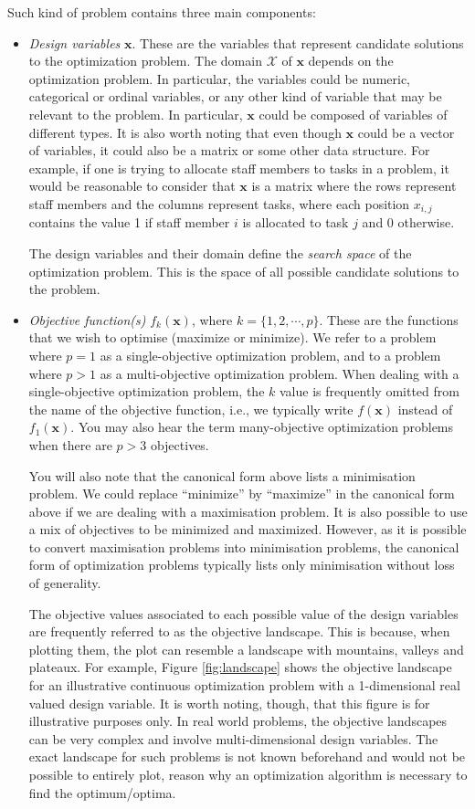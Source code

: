 Such kind of problem contains three main components:
\begin{itemize}
\item \textit{Design variables} $\mathbf{x}$. These are the variables that represent candidate solutions to the optimization problem. The domain $\mathcal{X}$ of $\mathbf{x}$ depends on the optimization problem. In particular, the variables could be numeric, categorical or ordinal variables, or any other kind of variable that may be relevant to the problem. In particular, $\mathbf{x}$ could be composed of variables of different types. It is also worth noting that even though $\mathbf{x}$ could be a vector of variables, it could also be a matrix or some other data structure. For example, if one is trying to allocate staff members to tasks in a problem, it would be reasonable to consider that $\mathbf{x}$ is a matrix where the rows represent staff members and the columns represent tasks, where each position $x_{i,j}$ contains the value 1 if staff member $i$ is allocated to task $j$ and 0 otherwise. 

The design variables and their domain define the \textit{search space} of the optimization problem. This is the space of all possible candidate solutions to the problem.

\item \textit{Objective function(s)} $f_k(\mathbf{x})$, where $k=\{1,2,\cdots,p\}$. These are the functions that we wish to optimise (maximize or minimize). We refer to a problem where $p=1$ as a single-objective optimization problem, and to a problem where $p>1$ as a multi-objective optimization problem. When dealing with a single-objective optimization problem, the $k$ value is frequently omitted from the name of the objective function, i.e., we typically write $f(\mathbf{x})$ instead of $f_1(\mathbf{x})$. You may also hear the term many-objective optimization problems when there are $p>3$ objectives. 

You will also note that the canonical form above lists a minimisation problem. We could replace ``minimize'' by ``maximize'' in the canonical form above if we are dealing with a maximisation problem. It is also possible to use a mix of objectives to be minimized and maximized. However, as it is possible to convert maximisation problems into minimisation problems, the canonical form of optimization problems typically lists only minimisation without loss of generality. 

The objective values associated to each possible value of the design variables are frequently referred to as the objective landscape. This is because, when plotting them, the plot can resemble a landscape with mountains, valleys and plateaux. For example, Figure \ref{fig:landscape} shows the objective landscape for an illustrative continuous optimization problem with a 1-dimensional real valued design variable. It is worth noting, though, that this figure is for illustrative purposes only. In real world problems, the objective landscapes can be very complex and involve multi-dimensional design variables. The exact landscape for such problems is not known beforehand and would not be possible to entirely plot, reason why an optimization algorithm is necessary to find the optimum/optima. 


\end{itemize}
